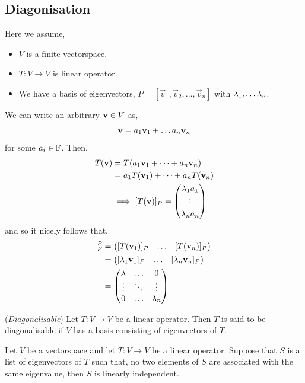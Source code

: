 \documentclass{article}
\begin{document}
\subsection{Diagonisation}
Here we assume,
\begin{itemize}
  \item $V$ is a finite vectorspace.
  \item $T : V \to V$ is linear operator.
  \item We have a basis of eigenvectors, $P = [\vec v_1, \vec v_2, \dots, \vec v_n]$ with $\lambda_1, \dots \lambda_n$.
\end{itemize}
We can write an arbitrary $\boldsymbol{\mathbf{v}} \in V$ as,
$$ \boldsymbol{\mathbf{v}} = a_1\boldsymbol{\mathbf{v}}_1 + \dots a_n\boldsymbol{\mathbf{v}}_n $$
for some $a_i \in \mathbb{F}$. Then,
\begin{align*}
  T(\boldsymbol{\mathbf{v}}) &= T(a_1\boldsymbol{\mathbf{v}}_1 + \dots + a_n\boldsymbol{\mathbf{v}}_n) \\
  &= a_1T(\boldsymbol{\mathbf{v}}_1) + \dots + a_nT(\boldsymbol{\mathbf{v}}_n) \\
  &\implies [T(\boldsymbol{\mathbf{v}})]_P = \begin{pmatrix}
    \lambda_1a_1 \\ \vdots \\ \lambda_na_n
\end{pmatrix}
\end{align*}
and so it nicely follows that,
\begin{align*}
  [T]_P^P &= \begin{pmatrix}
    [T(\v_1)]_P & \dots & [T(\v_n)]_P \\
  \end{pmatrix} \\
  &= \begin{pmatrix}
    [\l_1\v_1]_P & \dots & [\l_n\v_n]_P \\
  \end{pmatrix} \\
  &= \begin{pmatrix}
    \l & \dots & 0\\
    \vdots & \ddots & \vdots \\
    0 & \dots & \l_n
\end{pmatrix}
\end{align*}

\begin{ndefi}{(\textit{Diagonalisable})}
  Let $T: V \to V$ be a linear operator. Then $T$ is said to be diagonalisable if $V$ has a basis consisting of eigenvectors of $T$.
\end{ndefi}

\begin{nlemma}
  Let $V$ be a vectorspace and let $T: V \to V$ be a linear operator. Suppose that $S$ is a list of eigenvectors of $T$ such that, no two elements of $S$ are associated with the same eigenvalue, then $S$ is linearly independent.
\end{nlemma}
\end{document}
